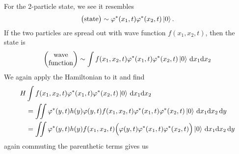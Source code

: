For the 2-particle state, we see it resembles
\begin{equation}
\begin{pmatrix}
\mbox{state}
\end{pmatrix}
\sim
\varphi^{*}(x_{1},t)\varphi^{*}(x_{2},t)\ket{0}.
\end{equation}
If the two particles are spread out with wave function $f(x_{1}, x_{2},
t)$, then the state is
\begin{equation}
\begin{pmatrix}
\mbox{wave}\\\mbox{function}
\end{pmatrix}
\sim
\int f(x_{1}, x_{2}, t)\varphi^{*}(x_{1},t)\varphi^{*}(x_{2},t)\ket{0}\,\mathrm{d}{x_{1}}\mathrm{d}{x_{2}}
\end{equation}
We again apply the Hamiltonian to it and find
\begin{subequations}
\begin{align}
H&\int f(x_{1}, x_{2}, t)\varphi^{*}(x_{1},t)\varphi^{*}(x_{2},t)\ket{0}\,\mathrm{d}{x_{1}}\mathrm{d}{x_{2}}\nonumber\\
&=\iint\varphi^{*}(y,t)h(y)\varphi(y,t)f(x_{1}, x_{2}, t)\varphi^{*}(x_{1},t)\varphi^{*}(x_{2},t)\ket{0}\,\mathrm{d}{x_{1}}\mathrm{d}{x_{2}}\,\mathrm{d}{y}\\
&=\iint\varphi^{*}(y,t)h(y)f(x_{1}, x_{2}, t)\Bigl(\varphi(y,t)\varphi^{*}(x_{1},t)\varphi^{*}(x_{2},t)\Bigr)\ket{0}\,\mathrm{d}{x_{1}}\mathrm{d}{x_{2}}\,\mathrm{d}{y}
\end{align}
\end{subequations}
again commuting the parenthetic terms gives us
